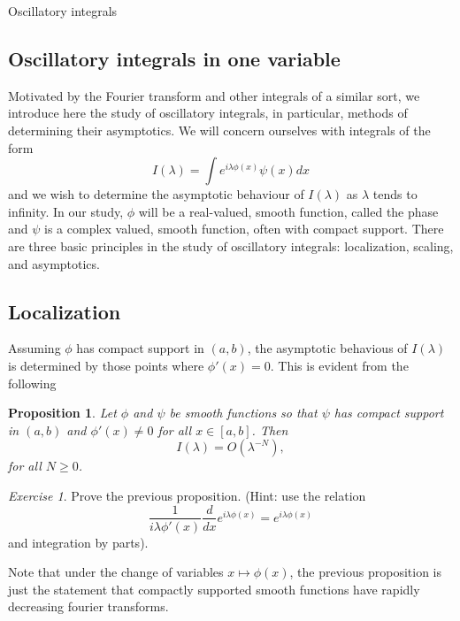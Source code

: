 \documentclass[11pt]{article}
\newtheorem{prop}[thm]{Proposition}
\theoremstyle{remark}
\newtheorem{exr}{Exercise}
\newcommand{\1}{\textbf{1}}
\begin{document}
\newpage
{\noindent\Large Oscillatory integrals \hfill}
\vspace{6mm}
\subsection*{Oscillatory integrals in one variable}
Motivated by the Fourier transform and other integrals of a similar sort, we introduce here the study of oscillatory integrals, in particular, methods of determining their asymptotics. We will concern ourselves with integrals of the form
\[
I(\lambda) = \int e^{ i \lambda \phi(x)} \psi(x) dx
\]
and we wish to determine the asymptotic behaviour of $I(\lambda)$ as $\lambda$ tends to infinity. In our study, $\phi$ will be a real-valued, smooth function, called the phase and $\psi$ is a complex valued, smooth function, often with compact support. There are three basic principles in the study of oscillatory integrals: localization, scaling, and asymptotics.
\subsection*{Localization}
Assuming $\phi$ has compact support in $(a,b)$, the asymptotic behavious of $I(\lambda)$ is determined by those points where $\phi'(x) = 0$. This is evident from the following
\begin{prop}
Let $\phi$ and $\psi$ be smooth functions so that $\psi$ has compact support in $(a,b)$ and $\phi'(x) \neq 0$ for all $x \in [a,b]$. Then
\[
I(\lambda) = O(\lambda^{-N}),
\]
for all $N \geq 0$.
\end{prop}
\begin{exr}
Prove the previous proposition. (Hint: use the relation 
\[
\frac{1}{i \lambda \phi'(x)} \frac{d}{dx} e^{i \lambda \phi(x)} = e^{i \lambda \phi(x)} 
\]
and integration by parts).
\end{exr}
Note that under the change of variables $x \mapsto \phi(x)$, the previous proposition is just the statement that compactly supported smooth functions have rapidly decreasing fourier transforms.
\end{document}
